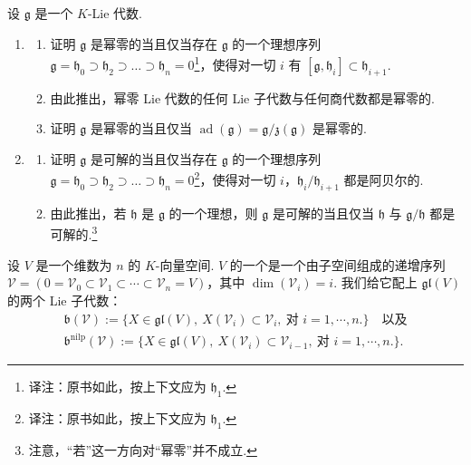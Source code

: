 \begin{exercise*}
设 $\mathfrak g$ 是一个 $K$-Lie 代数.
\begin{enumerate}[label=\roman*)]
\item
\begin{enumerate}[label=\alph*)]
\item 证明 $\mathfrak g$ 是幂零的当且仅当存在 $\mathfrak g$ 的一个理想序列 $\mathfrak g=\mathfrak h_{0}\supset\mathfrak h_{2}\supset\ldots\supset\mathfrak h_{n}=0$\footnote{译注：原书如此，按上下文应为 $\mathfrak h_{1}$.}，使得对一切 $i$ 有 $[\mathfrak g,\mathfrak h_{i}]\subset\mathfrak h_{i+1}$.
\item 由此推出，幂零 Lie 代数的任何 Lie 子代数与任何商代数都是幂零的.
\item 证明 $\mathfrak g$ 是幂零的当且仅当 $\operatorname{ad}(\mathfrak g)=\mathfrak g/\mathfrak z(\mathfrak g)$ 是幂零的.
\end{enumerate}
\item
\begin{enumerate}[label=\alph*)]
\item 证明 $\mathfrak g$ 是可解的当且仅当存在 $\mathfrak g$ 的一个理想序列 $\mathfrak g=\mathfrak h_{0}\supset\mathfrak h_{2}\supset\ldots\supset\mathfrak h_{n}=0$\footnote{译注：原书如此，按上下文应为 $\mathfrak h_{1}$.}，使得对一切 $i$，$\mathfrak h_{i}/\mathfrak h_{i+1}$ 都是阿贝尔的.
\item 由此推出，若 $\mathfrak h$ 是 $\mathfrak g$ 的一个理想，则 $\mathfrak g$ 是可解的当且仅当 $\mathfrak h$ 与 $\mathfrak g/\mathfrak h$ 都是可解的.\footnote{注意，``若''这一方向对``幂零''并不成立.}
\end{enumerate}
\end{enumerate}
\end{exercise*}
\begin{definition}\label{def:lie-2-3-2}
设 $V$ 是一个维数为 $n$ 的 $K$-向量空间. $V$ 的一个是一个由子空间组成的递增序列 $\mathcal V=(0=\mathcal V_{0}\subset\mathcal V_{1}\subset\cdots\subset\mathcal V_{n}=V)$，其中 $\dim(\mathcal V_{i})=i$. 我们给它配上 $\mathfrak{gl}(V)$ 的两个 Lie 子代数：
\begin{gather*}
\mathfrak b(\mathcal V):=\{X\in\mathfrak{gl}(V),\ X(\mathcal V_{i})\subset\mathcal V_{i},\ \text{对 }i=1,\cdots,n.\}\quad\text{以及}\\
\mathfrak b^{\mathrm{nilp}}(\mathcal V):=\{X\in\mathfrak{gl}(V),\ X(\mathcal V_{i})\subset\mathcal V_{i-1},\ \text{对 }i=1,\cdots,n.\}.
\end{gather*}
\end{definition}
